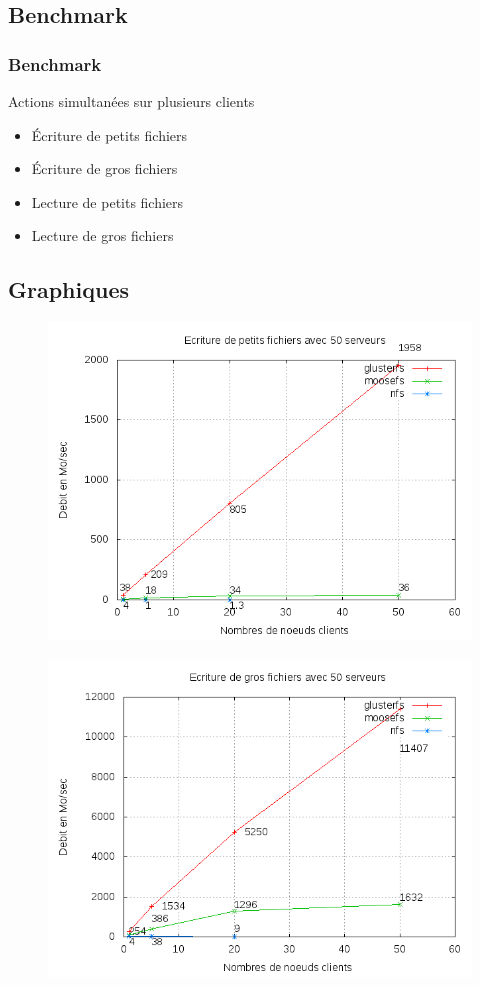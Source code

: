\documentclass[blue]{beamer}
\begin{document}
	\subsection{Benchmark}
		\begin{frame}
		\frametitle{Benchmark}
			Actions simultanées sur plusieurs clients
			\begin{itemize}
				\item Écriture de petits fichiers
				\item Écriture de gros fichiers
				\item Lecture de petits fichiers
				\item Lecture de gros fichiers
			\end{itemize}
		\end{frame}

	\subsection{Graphiques}
		\begin{frame}
			\begin{figure}
				\includegraphics[width=0.8\linewidth]{../images/srv50ws2.png}
			\end{figure}
		\end{frame}

		\begin{frame}
			\begin{figure}
				\includegraphics[width=0.8\linewidth]{../images/srv50wb2.png}
			\end{figure}
		\end{frame}
\end{document}
